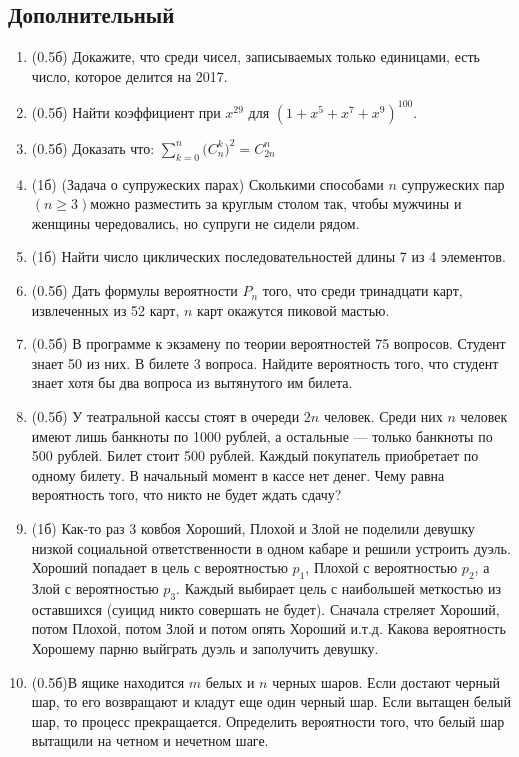 \documentclass[a4paper, 14pt]{extarticle}
\begin{document}
\subsection{Дополнительный}
\begin{enumerate}
\item (0.5б) Докажите, что среди чисел, записываемых только единицами, есть число, которое делится на 2017.
\item (0.5б) Найти коэффициент при $x^{29}$ для $(1 + x^5 + x^7 + x^9)^{100}$.
\item (0.5б) Доказать что:
$\sum_{k=0}^{n} \big(C_n^k\big)^2 = C_{2n}^n$
\item (1б) (Задача о супружеских парах) Сколькими способами $n$ супружеских пар $(n \geq 3)$можно разместить за круглым столом так, чтобы мужчины и женщины чередовались, но супруги не сидели рядом.
\item (1б) Найти число циклических последовательностей длины 7 из 4 элементов.
\item (0.5б) Дать формулы вероятности $P_n$ того, что среди тринадцати карт, извлеченных из 52 карт,
$n$ карт окажутся пиковой мастью.
\item (0.5б) В программе к экзамену по теории вероятностей 75 вопросов. 
Студент знает 50 из них. В билете 3 вопроса. Найдите вероятность того, 
что студент знает хотя бы два вопроса из вытянутого им билета. 
\item (0.5б) У театральной кассы стоят в очереди $2n$ человек. Среди
	них $n$ человек имеют лишь банкноты по 1000 рублей, а остальные —
	только банкноты по 500 рублей. Билет стоит 500 рублей. Каждый покупатель
	приобретает по одному билету. В начальный момент в кассе нет денег.
	Чему равна вероятность того, что никто не будет ждать сдачу?

\item (1б) Как-то раз 3 ковбоя Хороший, Плохой и Злой не поделили девушку низкой социальной ответственности в одном кабаре и решили устроить дуэль. Хороший попадает в цель с вероятностью $p_1$, Плохой с вероятностью $p_2$, а Злой с вероятностью $p_3$. Каждый выбирает цель с наибольшей меткостью из оставшихся (суицид никто совершать не будет). Сначала стреляет Хороший, потом Плохой, потом Злой и потом опять Хороший и.т.д. Какова вероятность Хорошему парню выйграть дуэль и заполучить девушку.
\item (0.5б)В ящике находится $m$ белых и $n$ черных шаров. Если достают черный шар, то его возвращают и кладут еще один черный шар. Если вытащен белый шар, то процесс прекращается. Определить вероятности того, что белый шар вытащили на четном и нечетном шаге.

\end{enumerate}
\end{document}
